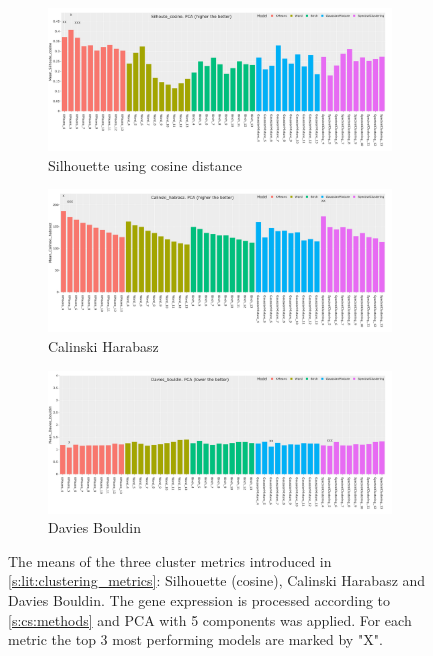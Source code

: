 \begin{figure}[H]
    \captionsetup[subfigure]{justification=Centering}
    \centering
    \begin{subfigure}[!t]{0.85\textwidth}
        \includegraphics[width=\textwidth]{Sections/ClusteringAnalysis/Resources/cs_top3/PCA_top3_Silhoute_cosine.png}
        \caption{Silhouette using cosine distance}
        \label{fig:cs:cosine}
    \end{subfigure}
    \centering
    \begin{subfigure}[!t]{0.85\textwidth}
        \includegraphics[width=\textwidth]{Sections/ClusteringAnalysis/Resources/cs_top3/PCA_top3_Calinski_habrasz.png}
        \caption{Calinski Harabasz}
        \label{fig:cs:cal_hab}
    \end{subfigure}
    \centering
    \begin{subfigure}[!t]{0.85\textwidth}
        \includegraphics[width=\textwidth]{Sections/ClusteringAnalysis/Resources/cs_top3/PCA_top3_Davies_bouldin.png}
        \caption{Davies Bouldin}
        \label{fig:cs:dav_boul}
    \end{subfigure}
    \caption{The means of the three cluster metrics introduced in \cref{s:lit:clustering_metrics}: Silhouette (cosine), Calinski Harabasz and Davies Bouldin. The gene expression is processed according to \cref{s:cs:methods} and PCA with 5 components was applied. For each metric the top 3 most performing models are marked by "X". }
    \label{fig:cs:cs_metrics}
\end{figure}

